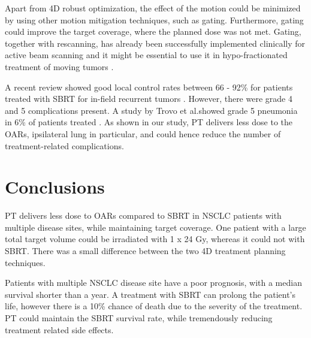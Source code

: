 Apart from 4D robust optimization, the effect of the motion could be minimized by using other motion mitigation techniques, such as gating. Furthermore, gating could improve the target coverage, where the planned dose was
not met. Gating, together with rescanning, has already been successfully implemented clinically for active beam scanning \cite{Rossi2016, Mori2016} and it might be essential to use it in hypo-fractionated 
treatment of moving tumors \cite{Richter2014}.

A recent review showed good local control rates between 66 - 92\% for patients treated with SBRT for in-field recurrent tumors \cite{Amini2014}. 
However, there were grade 4 and 5 complications present. A study by Trovo et al.showed grade 5 pneumonia in
6\% of patients treated \cite{Trovo2014}. As shown in our study, PT delivers less dose to the OARs, ipsilateral lung in particular, and could hence reduce the number of treatment-related
complications.

\section{Conclusions}

PT delivers less dose to OARs compared to SBRT in NSCLC patients with multiple disease sites, while maintaining target coverage. One patient with a large total target volume 
could be irradiated with 1 x 24 Gy, whereas it could not with SBRT. 
There was a small difference between the two 4D treatment planning techniques.

Patients with multiple NSCLC disease site have a poor prognosis, with a median survival shorter than a year. 
A treatment with SBRT can prolong the patient's life, however there is a 10\% chance of death due to the severity of the treatment. PT could
maintain the SBRT survival rate, while tremendously reducing treatment related side effects.